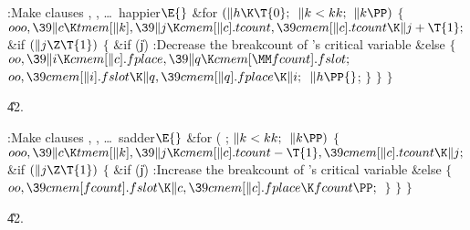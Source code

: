 \B{}:Make clauses , , \dots\ happier\X${}\E{}$\6
\&{for} ${}(\|h\K\T{0};{}$ ${}\|k<\\{kk};{}$ ${}\|k\PP){}$\5
${}\{{}$\1\6
${}\\{ooo},\39\|c\K\\{tmem}[\|k],\39\|j\K\\{cmem}[\|c].\\{tcount},\39\\{cmem}[%
\|c].\\{tcount}\K\|j+\T{1};{}$\6
\&{if} ${}(\|j\Z\T{1}){}$\5
${}\{{}$\1\6
\&{if} (\|j)\1\5
:Decrease the breakcount of 's critical variable\X\2\6
\&{else}\5
${}\{{}$\1\6
${}\\{oo},\39\|i\K\\{cmem}[\|c].\\{fplace},\39\|q\K\\{cmem}[\MM\\{fcount}].%
\\{fslot};{}$\6
${}\\{oo},\39\\{cmem}[\|i].\\{fslot}\K\|q,\39\\{cmem}[\|q].\\{fplace}\K\|i;{}$\6
${}\|h\PP{}$;\6
\4${}\}{}$\2\6
\4${}\}{}$\2\6
\4${}\}{}$\2\par
\U42.\fi

\B{}:Make clauses , , \dots\ sadder\X${}\E{}$\6
\&{for} ( ; ${}\|k<\\{kk};{}$ ${}\|k\PP){}$\5
${}\{{}$\1\6
${}\\{ooo},\39\|c\K\\{tmem}[\|k],\39\|j\K\\{cmem}[\|c].\\{tcount}-\T{1},\39%
\\{cmem}[\|c].\\{tcount}\K\|j;{}$\6
\&{if} ${}(\|j\Z\T{1}){}$\5
${}\{{}$\1\6
\&{if} (\|j)\1\5
:Increase the breakcount of 's critical variable\X\2\6
\&{else}\5
${}\{{}$\1\6
${}\\{oo},\39\\{cmem}[\\{fcount}].\\{fslot}\K\|c,\39\\{cmem}[\|c].\\{fplace}\K%
\\{fcount}\PP;{}$\6
\4${}\}{}$\2\6
\4${}\}{}$\2\6
\4${}\}{}$\2\par
\U42.\fi

